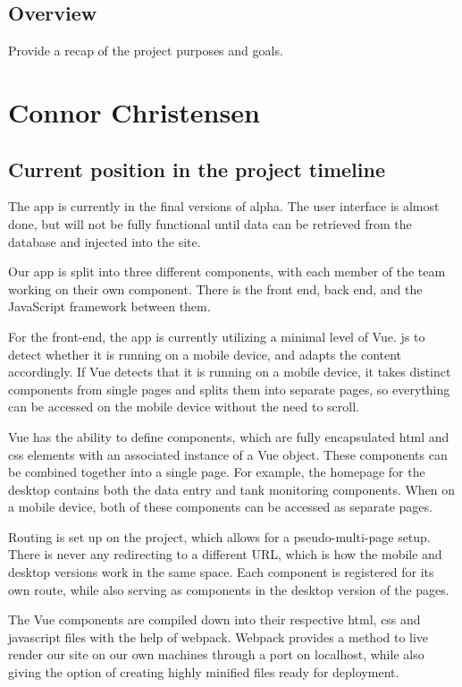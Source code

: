 \documentclass[draftclsnofoot,onecolumn,letterpaper,10pt,compsoc]{IEEEtran}
\begin{document}
\subsection{Overview}
Provide a recap of the project purposes and goals. \\

\section{Connor Christensen}
\subsection{Current position in the project timeline}

The app is currently in the final versions of alpha.
The user interface is almost done, but will not be fully functional until data can be retrieved from the database and injected into the site.


Our app is split into three different components, with each member of the team working on their own component.
There is the front end, back end, and the JavaScript framework between them.


For the front-end, the app is currently utilizing a minimal level of Vue.
js to detect whether it is running on a mobile device, and adapts the content accordingly.
If Vue detects that it is running on a mobile device, it takes distinct components from single pages and splits them into separate pages, so everything can be accessed on the mobile device without the need to scroll.


Vue has the ability to define components, which are fully encapsulated html and css elements with an associated instance of a Vue object.
These components can be combined together into a single page.
For example, the homepage for the desktop contains both the data entry and tank monitoring components.
When on a mobile device, both of these components can be accessed as separate pages.


Routing is set up on the project, which allows for a pseudo-multi-page setup.
There is never any redirecting to a different URL, which is how the mobile and desktop versions work in the same space.
Each component is registered for its own route, while also serving as components in the desktop version of the pages.


The Vue components are compiled down into their respective html, css and javascript files with the help of webpack.
Webpack provides a method to live render our site on our own machines through a port on localhost, while also giving the option of creating highly minified files ready for deployment.
\end{document}
